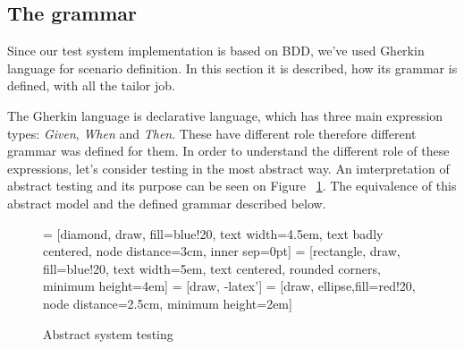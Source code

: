 \documentclass[conference]{IEEEtran}
\begin{document}
\subsection{The grammar}
Since our test system implementation is based on BDD, we've used Gherkin language for scenario definition. In this section it is described, how its grammar is defined, with all the tailor job.

The Gherkin language is declarative language, which has three main expression types: \textit{Given}, \textit{When} and \textit{Then}. These have different role therefore different grammar was defined for them. In order to understand the different role of these expressions, let's consider testing in the most abstract way. An imterpretation of abstract testing and its purpose can be seen on Figure ~\ref{fig:absSysTest}. The equivalence of this abstract model and the defined grammar described below.

\begin{figure}[hbt!]
    \caption{Abstract system testing}
    \centering
    \label{fig:absSysTest}
  
     = [diamond, draw, fill=blue!20, text width=4.5em, text badly centered, node distance=3cm, inner sep=0pt]
     = [rectangle, draw, fill=blue!20, text width=5em, text centered, rounded corners, minimum height=4em]
     = [draw, -latex']
     = [draw, ellipse,fill=red!20, node distance=2.5cm, minimum height=2em]
    
\end{figure}
\end{document}
